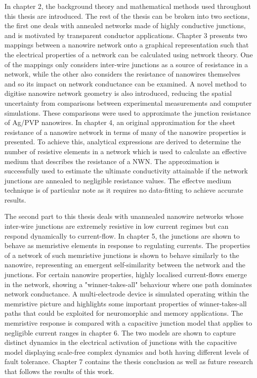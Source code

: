 In chapter 2, the background theory and mathematical methods used throughout this thesis are introduced. The rest of the thesis can be broken into two sections, the first one deals with annealed networks made of highly conductive junctions, and is motivated by transparent conductor applications. Chapter 3 presents two mappings between a nanowire network onto a graphical representation such that the electrical properties of a network can be calculated using network theory. One of the mappings only considers inter-wire junctions as a source of resistance in a network, while the other also considers the resistance of nanowires themselves and so its impact on network conductance can be examined. A novel method to digitise nanowire network geometry is also introduced, reducing the spatial uncertainty from comparisons between experimental measurements and computer simulations. These comparisons were used to approximate the junction resistance of Ag/PVP nanowires. In chapter 4, an original approximation for the sheet resistance of a nanowire network in terms of many of the nanowire properties is presented. To achieve this, analytical expressions are derived to determine the number of resistive elements in a network which is used to calculate an effective medium that describes the resistance of a NWN. The approximation is successfully used to estimate the ultimate conductivity attainable if the network junctions are annealed to negligible resistance values. The effectve medium technique is of particular note as it requires no data-fitting to achieve accurate results.

The second part to this thesis deals with unannealed nanowire networks whose inter-wire junctions are extremely resistive in low current regimes but can respond dynamically to current-flow. In chapter 5, the junctions are shown to behave as memristive elements in response to regulating currents. The properties of a network of such memristive junctions is shown to behave similarly to the nanowire, representing an emergent self-similarity between the network and the junctions. For certain nanowire properties, highly localised current-flows emerge in the network, showing a "winner-takes-all" behaviour where one path dominates network conductance. A multi-electrode device is simulated operating within the memristive picture and highlights some important properties of winner-takes-all paths that could be exploited for neuromorphic and memory applications. The memristive response is compared with a capacitive junction model that applies to negligible current ranges in chapter 6. The two models are shown to capture distinct dynamics in the electrical activation of junctions with the capacitive model displaying scale-free complex dynamics and both having different levels of fault tolerance. Chapter 7 contains the thesis conclusion as well as future research that follows the results of this work. 
